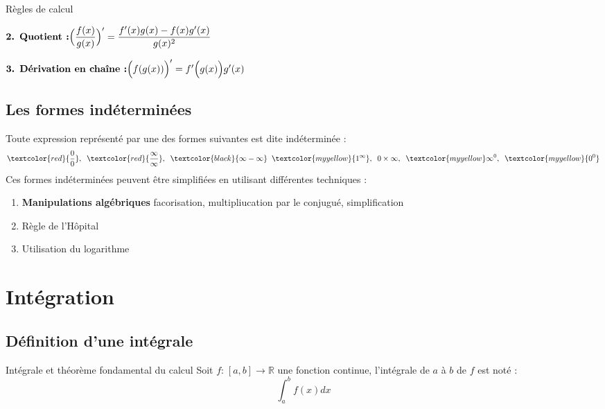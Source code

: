 \documentclass{report}
\newcommand{\varitem}[3][black]{%
    \item[%
        \colorbox{#2}{\textcolor{#1}{\makebox(5.5,7){#3}}}%
    ]
}
\begin{document}
\begin{multicols*}{3}
\begin{Concept}{Règles de calcul}{}
\vspace{1em}

\begin{adjustbox}{width=1\textwidth}
  $\textbf{2. Quotient :} \Bigl(\dfrac{f(x)}{g(x)}\Bigr)^{\prime} = \dfrac{f^{\prime}(x)g(x) - f(x)g^{\prime}(x)}{g(x)^2}$ 
\end{adjustbox}

\vspace{1em}

\begin{adjustbox}{width=1\textwidth}
  $\textbf{3. Dérivation en chaîne :} \Bigl(f(g(x)) \Bigr)^{\prime} = f^{\prime}\Bigl(g(x)\Bigr)g^{\prime}(x)$
\end{adjustbox}
\end{Concept} 

\section{Les formes indéterminées}
Toute expression représenté par une des formes suivantes est dite \textcolor{myb}{indéterminée} :
\begin{align*}
  \textcolor{red}{\dfrac{0}{0}}, \;\; \textcolor{red}{\dfrac{\infty}{\infty}}, \;\; 
  \textcolor{black}{\infty - \infty} \;\; \textcolor{myyellow}{1^{\infty}}, \;\; 
  0 \times \infty, \;\; \textcolor{myyellow}\infty^{0}, \;\; \textcolor{myyellow}{0^0}   
\end{align*}
Ces formes indéterminées peuvent être simplifiées en utilisant différentes techniques :
\begin{enumerate}
  \varitem{black}{} \textbf{Manipulations algébriques} facorisation, multipliucation par le conjugué, simplification
  \varitem{red}{} Règle de l'Hôpital 
  \varitem{myyellow}{} Utilisation du logarithme
\end{enumerate}

\chapter{Intégration}
\section{Définition d'une intégrale}

\begin{Concept}{Intégrale et théorème fondamental du calcul}{}
  Soit $f \text{:} \; [a,b] \rightarrow \mathbb{R} $ une fonction continue, \textcolor{myb}{l'intégrale} 
  de $a$ à $b$ de $f$ est noté :  
  \[ \int_{a}^{b}f(x)dx \]
\end{Concept}



\end{multicols*}
\end{document}
